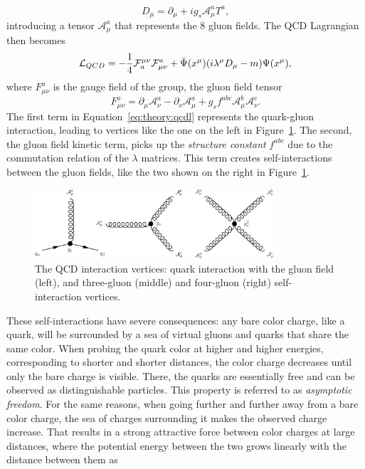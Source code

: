 \begin{equation}
  D_\mu=\partial_\mu + ig_s \mathcal{A}_{\mu}^a T^a ,
\end{equation}
introducing a tensor $\mathcal{A}_{\mu}^a$ that represents the 8 gluon fields.
The QCD Lagrangian then becomes
\begin{equation}
  \label{eq:theory:qcdl}
   \mathcal{L}_{QCD} =-\frac{1}{4}{\cal F}_{a}^{\mu\nu}{\cal F}^{a}_{\mu\nu}+\bar{\Psi}(x^{\mu})(i\lambda^{\mu}D_{\mu}-m)\Psi(x^{\mu}),
\end{equation}
where $F_{\mu\nu}^a$ is the gauge field of the group, the gluon field tensor 
\begin{equation}
F_{\mu\nu}^a=\partial_{\mu} \mathcal{A}_{\nu}^a-\partial_{\nu} \mathcal{A}_{\mu}^a+g_s f^{abc}\mathcal{A}_{\mu}^b\mathcal{A}_{\nu}^c.
\end{equation}
The first term in Equation~\ref{eq:theory:qcdl} represents the quark-gluon interaction, leading to vertices like the one on the left in Figure~\ref{fig:theory:qcdint}. The second, the gluon field kinetic term, picks up the \emph{structure constant} $f^{abc}$ due to the commutation relation of the $\lambda$ matrices. This term creates self-interactions between the gluon fields, like the two shown on the right in Figure~\ref{fig:theory:qcdint}.
\begin{figure}[h!]
\centering
\includegraphics[width=0.79\textwidth]{figures/theory/QCD_vtx.pdf}
\caption{The QCD interaction vertices: quark interaction with the gluon field (left), and three-gluon (middle) and four-gluon (right) self-interaction vertices.}
\label{fig:theory:qcdint}
\end{figure}
These self-interactions have severe consequences: any bare color charge, like a quark, will be surrounded by a sea of virtual gluons and quarks that share the same color. When probing the quark color at higher and higher energies, corresponding to shorter and shorter distances, the color charge decreases until only the bare charge is visible. There, the quarks are essentially free and can be observed as distinguishable particles. This property is referred to as \emph{asymptotic freedom}. For the same reasons, when going further and further away from a bare color charge, the sea of charges surrounding it makes the observed charge increase. That results in a strong attractive force between color charges at large distances, where the potential energy between the two grows linearly with the distance between them as
